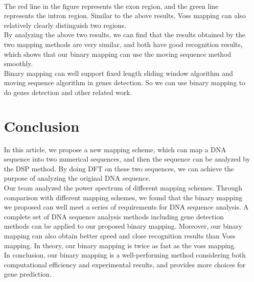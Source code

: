 \documentclass[conference]{IEEEtran}
\begin{document}
~\\\indent The red line in the figure represents the exon region, and the green line represents the intron region. Similar to the above results, Voss mapping can also relatively clearly distinguish two regions.
~\\\indent By analyzing the above two results, we can find that the results obtained by the two mapping methods are very similar, and both have good recognition results, which shows that our binary mapping can use the moving sequence method smoothly.
~\\\indent Binary mapping can well support fixed length sliding window algorithm and moving sequence algorithm in genes detection. So we can use binary mapping to do genes detection and other related work.

\section{Conclusion}
In this article, we propose a new mapping scheme, which can map a DNA sequence into two numerical sequences, and then the sequence can be analyzed by the DSP method. By doing DFT on these two sequences, we can achieve the purpose of analyzing the original DNA sequence. 
~\\\indent Our team analyzed the power spectrum of different mapping schemes. Through comparison with different mapping schemes, we found that the binary mapping we proposed can well meet a series of requirements for DNA sequence analysis. A complete set of DNA sequence analysis methods including gene detection methods can be applied to our proposed binary mapping. Moreover, our binary mapping can also obtain better speed and close recognition results than Voss mapping. In theory, our binary mapping is twice as fast as the voss mapping.
~\\\indent In conclusion, our binary mapping is a well-performing method considering both computational efficiency and experimental results, and provides more choices for gene prediction.
\newpage
\nocite{*}


\end{document}

